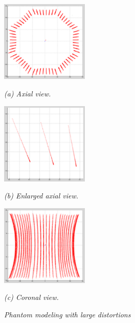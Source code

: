 \begin{figure}[htb]

  \begin{minipage}[b]{1.65in}
    \centering
    \centerline{\mbox{\includegraphics[width=1.65in]{isocenter/images/simulation/axial_distortion_0.eps}}}
    \centerline{\emph{(a) Axial view.}}\medskip
  \end{minipage}
  \hfill
  \begin{minipage}[b]{1.65in}
    \centering
    \centerline{\mbox{\includegraphics[width=1.65in]{isocenter/images/simulation/axial_tube_distortion_0.eps}}}
    \centerline{\emph{(b) Enlarged axial view.}}\medskip
  \end{minipage}
  \begin{minipage}[b]{1.65in}
    \centering
    \centerline{\mbox{\includegraphics[width=1.65in]{isocenter/images/simulation/coronal_distortion_0.eps}}}
    \centerline{\emph{(c) Coronal view.}}\medskip
  \end{minipage}
%
\caption{\emph{Phantom modeling with large distortions}} \label{fig:2}
%
\end{figure}

